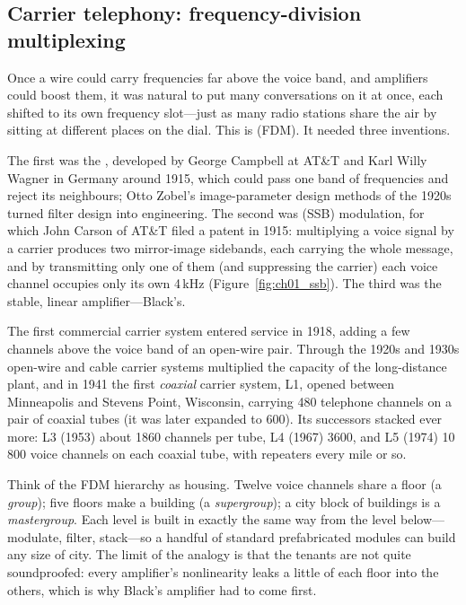 \subsection{Carrier telephony: frequency-division multiplexing}
\label{sec:ch01:carrier}

Once a wire could carry frequencies far above the voice band, and amplifiers could boost them, it
was natural to put many conversations on it at once, each shifted to its own frequency slot---just as
many radio stations share the air by sitting at different places on the dial. This is
 (FDM). It needed three inventions.

The first was the , developed by George Campbell at AT\&T and Karl Willy
Wagner in Germany around 1915, which could pass one band of frequencies and reject its neighbours;
Otto Zobel's image-parameter design methods of the 1920s turned filter design into engineering. The
second was  (SSB) modulation, for which John Carson of AT\&T filed a patent in
1915: multiplying a voice signal by a carrier produces two mirror-image sidebands, each carrying the
whole message, and by transmitting only one of them (and suppressing the carrier) each voice channel
occupies only its own 4\,kHz (Figure~\ref{fig:ch01_ssb}). The third was the stable, linear
amplifier---Black's.


The first commercial carrier system entered service in 1918, adding a few channels above the voice
band of an open-wire pair. Through the 1920s and 1930s open-wire and cable carrier systems multiplied
the capacity of the long-distance plant, and in 1941 the first \emph{coaxial} carrier system, L1,
opened between Minneapolis and Stevens Point, Wisconsin, carrying 480 telephone channels on a pair of
coaxial tubes (it was later expanded to 600). Its successors stacked ever more: L3 (1953) about 1860
channels per tube, L4 (1967) 3600, and L5 (1974) 10\,800 voice channels on each coaxial tube, with
repeaters every mile or so.

\begin{analogy}
Think of the FDM hierarchy as housing. Twelve voice channels share a floor (a \emph{group}); five
floors make a building (a \emph{supergroup}); a city block of buildings is a \emph{mastergroup}. Each
level is built in exactly the same way from the level below---modulate, filter, stack---so a handful
of standard prefabricated modules can build any size of city. The limit of the analogy is that the
tenants are not quite soundproofed: every amplifier's nonlinearity leaks a little of each floor into
the others, which is why Black's amplifier had to come first.
\end{analogy}

